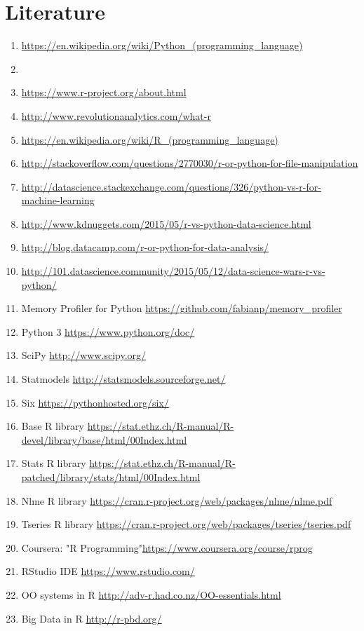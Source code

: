 \documentclass{article}
\begin{document}
\section{Literature}
\begin{enumerate}
    \item \url{https://en.wikipedia.org/wiki/Python_(programming_language)}
    \item
    \item \url{https://www.r-project.org/about.html}
    \item \url{http://www.revolutionanalytics.com/what-r}
    \item \url{https://en.wikipedia.org/wiki/R_(programming_language)}
    \item \url{http://stackoverflow.com/questions/2770030/r-or-python-for-file-manipulation}
    \item \url{http://datascience.stackexchange.com/questions/326/python-vs-r-for-machine-learning}
    \item \url{http://www.kdnuggets.com/2015/05/r-vs-python-data-science.html}
    \item \url{http://blog.datacamp.com/r-or-python-for-data-analysis/}
    \item \url{http://101.datascience.community/2015/05/12/data-science-wars-r-vs-python/}
    \item Memory Profiler for Python \url{https://github.com/fabianp/memory_profiler} 
    \item Python 3 \url{https://www.python.org/doc/}
    \item SciPy \url{http://www.scipy.org/}
    \item Statmodels \url{http://statsmodels.sourceforge.net/}
    \item Six \url{https://pythonhosted.org/six/}
    \item Base R library \url{https://stat.ethz.ch/R-manual/R-devel/library/base/html/00Index.html}
    \item Stats R library \url{https://stat.ethz.ch/R-manual/R-patched/library/stats/html/00Index.html}
    \item Nlme R library \url{https://cran.r-project.org/web/packages/nlme/nlme.pdf}
    \item Tseries R library \url{https://cran.r-project.org/web/packages/tseries/tseries.pdf}
    \item Coursera: "R Programming"\url{https://www.coursera.org/course/rprog}
    \item RStudio IDE \url{https://www.rstudio.com/}
    \item OO systems in R \url{http://adv-r.had.co.nz/OO-essentials.html}
    \item Big Data in R \url{http://r-pbd.org/}
\end{enumerate}
\end{document}
